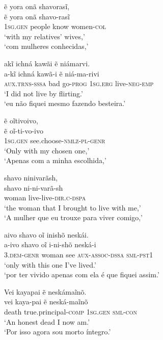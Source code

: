 \documentclass[output=paper,
modfonts,nonflat
]{langsci/langscibook}
\begin{document}
\ea ẽ yora onã shavorasĩ, \\[.3em]
\gll ẽ                yora   onã  shavo-rasĩ         \\
     1\textsc{sg.gen} people know women-\textsc{col} \\
\glt `with my relatives' wives,' \\
`com mulheres conhecidas,'\\
\z

\ea akĩ ichná kawãi ẽ niámarvi. \\[.3em]
\gll a-kĩ                   ichná kawã-i         ẽ                niá-ma-rivi           \\
     \textsc{aux.trns-sssa} bad   go-\textsc{prog} \textsc{1sg.erg} live-\textsc{neg-emp} \\
\glt `I did not live by flirting.' \\
`eu não fiquei mesmo fazendo besteira.' \\
\z

\ea ẽ oĩtivoivo, \\[.3em]
\gll ẽ                oĩ-ti-vo-ivo                     \\
     1\textsc{sg.gen} see.choose-\textsc{nmlz-pl-genr} \\
\glt `Only with my chosen one,' \\
`Apenas com a minha escolhida,'\\
\z

\ea shavo ninivarãsh, \\[.3em]
\gll shavo ni-ni-varã-sh                       \\
     woman live-live-\textsc{dir.c-dspa} \\
\glt `the woman that I brought to live with me,' \\
`A mulher que eu trouxe para viver comigo,' \\
\z

\ea aivo shavo oĩ inishõ neskái. \\[.3em]
\gll a-ivo               shavo oĩ  i-ni-shõ                neská-i           \\
     3.\textsc{dem-genr} woman see \textsc{aux-assoc-dssa} \textsc{sml-pst1} \\
\glt `only with this one I've lived.' \\
`por ter vivido apenas com ela é que fiquei assim.' \\
\z

\newpage 
\ea Vei kayapai ẽ neskámaĩnõ. \\[.3em]
\gll vei   kaya-pai                     ẽ                neská-maĩnõ      \\
     death true.principal-\textsc{comp} \textsc{1sg.gen} \textsc{sml-con} \\
\glt `An honest dead I now am.' \\
`Por isso agora sou morto íntegro.'\\
\z
\end{document}
